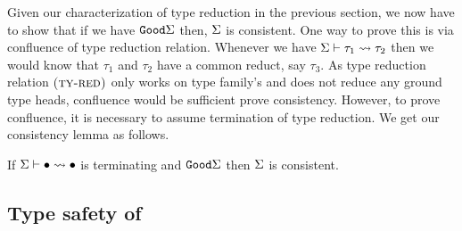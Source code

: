 \documentclass[format=acmsmall,manuscript,review,screen,nonacm,margin=1in,11pt]{acmart}
\begin{document}
Given our characterization of type reduction in the previous section, we now have to show
that if we have $\texttt{Good}\Sigma$ then, $\Sigma$ is consistent. One way to prove this is
via confluence of type reduction relation. Whenever we have $\Sigma \vdash \tau_1 \rightsquigarrow \tau_2$
then we would know that $\tau_1$ and $\tau_2$ have a common reduct, say $\tau_3$. As type reduction
relation $\textsc{(ty-red)}$ only works on type family's and does not reduce any ground type heads,
confluence would be sufficient prove consistency. However, to prove confluence, it is necessary to assume
termination of type reduction. We get our consistency lemma as follows.
\begin{lemma}[Consistency]
  If $\Sigma \vdash \bullet \rightsquigarrow \bullet$ is terminating and $\texttt{Good}\Sigma$ then $\Sigma$ is consistent.
\end{lemma}

\subsection{Type safety of \CLTF{}}\label{subsec:tf-closed-safety}
\newcommand\SApp{
  \ib{\irule[\trule{s-app}]
    {\stepsto {\Tm_1} {\Tm'_1}};
    {\stepsto {\Tm_1\App\Tm_2} {\Tm'_1\App\Tm_2}}}
}
\newcommand\STApp{
  \ib{\irule[\trule{s-tapp}]
    {\stepsto {\Tm_1} {\Tm'_1}};
    {\stepsto {\Tm_1\App\tau} {\Tm'_1\App\tau}}}
}

\newcommand\SCApp{
  \ib{\irule[\trule{s-capp}]
    {\stepsto {\Tm_1} {\Tm'_1}};
    {\stepsto {\Tm_1\App\Co} {\Tm'_1\App\Co}}}
}

\newcommand\SCast{
  \ib{\irule[\trule{s-cast}]
    {\stepsto {\Tm_1} {\Tm'_1}};
    {\stepsto {\cast{\Tm_1}\Co} {\cast{\Tm'_1}\Co}}}
}

\newcommand\SBeta{
  \ib{\irule[\trule{s-$\beta$}];
    {\stepsto {(\Lam x \tau \Tm_1)\App\Tm_2} {\Tm_1[x/\Tm_2]}}
  }
}
\newcommand\STBeta{
  \ib{\irule[\trule{s-T$\beta$}];
    {\stepsto {(\TLam \alpha \Tm)\App\tau} {\Tm[\alpha/\tau]}}
  }
}

\newcommand\SPush{
  \ib{\irule[\trule{s-push}]
    {\Co_1 = \sym{\nth 0 \Co}}
    {\Co_2 = \nth 1 \Co};
    {\stepsto {(\cast {\Lam x \tau \Tm} \Co) \App \Tm_1} {\cast {(\Lam x \tau \Tm)\App(\cast{\Tm_1} {\Co_1})} {\Co_2}}}
  }
}
\newcommand\STPush{
  \ib{\irule[\trule{s-tpush}];
    {\stepsto {(\cast {\TLam \alpha \Tm} \Co) \App \tau} {\cast {(\TLam \alpha \Tm)\App\tau} {\Co@\tau}}}
  }
}
\newcommand\STrans{
  \ib{\irule[\trule{s-trans}];
    {\stepsto {\cast {(\cast \Tm \Co)} \MoreCo} {\cast \Tm {\comp\Co\MoreCo}}}
  }
  
}
\end{document}
